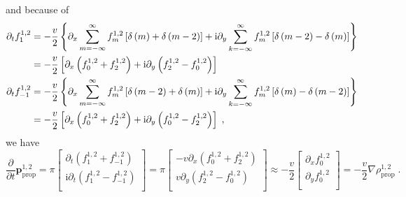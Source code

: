 \documentclass{article}
\begin{document}
and because of 
\begin{subequations}
    \begin{align}
        \partial _tf_{1}^{1,2}&=-\frac{v}{2}\left\{ \partial _x\sum_{m=-\infty}^{\infty}{f_{m}^{1,2}}\left[ \delta \left( m \right) +\delta \left( m-2 \right) \right] +\mathrm{i}\partial _y\sum_{k=-\infty}^{\infty}{f_{m}^{1,2}}\left[ \delta \left( m-2 \right) -\delta \left( m \right) \right] \right\}\notag\\
        &=-\frac{v}{2}\left[ \partial _x\left( f_{0}^{1,2}+f_{2}^{1,2} \right) +\mathrm{i}\partial _y\left( f_{2}^{1,2}-f_{0}^{1,2} \right) \right]\\
        \partial _tf_{-1}^{1,2}&=-\frac{v}{2}\left\{ \partial _x\sum_{m=-\infty}^{\infty}{f_{m}^{1,2}}\left[ \delta \left( m-2 \right) +\delta \left( m \right) \right] +\mathrm{i}\partial _y\sum_{k=-\infty}^{\infty}{f_{m}^{1,2}}\left[ \delta \left( m \right) -\delta \left( m-2 \right) \right] \right\}\notag\\
        &=-\frac{v}{2}\left[ \partial _x\left( f_{0}^{1,2}+f_{2}^{1,2} \right) +\mathrm{i}\partial _y\left( f_{0}^{1,2}-f_{2}^{1,2} \right) \right]\;,
    \end{align}
\end{subequations}
we have
\begin{equation}
    \frac{\partial}{\partial t}\boldsymbol{p}_{\mathrm{prop}}^{1,2}=\pi \left[ \begin{array}{c}
        \partial _t\left( f_{1}^{1,2}+f_{-1}^{1,2} \right)\\
        \mathrm{i}\partial _t\left( f_{1}^{1,2}-f_{-1}^{1,2} \right)\\
    \end{array} \right] =\pi \left[ \begin{array}{c}
        -v\partial _x\left( f_{0}^{1,2}+f_{2}^{1,2} \right)\\
        v\partial _y\left( f_{2}^{1,2}-f_{0}^{1,2} \right)\\
    \end{array} \right] \approx -\frac{v}{2}\left[ \begin{array}{c}
        \partial _xf_{0}^{1,2}\\
        \partial _yf_{0}^{1,2}\\
    \end{array} \right] =-\frac{v}{2}\nabla \rho _{\mathrm{prop}}^{1,2}\;.
\end{equation}
\end{document}
